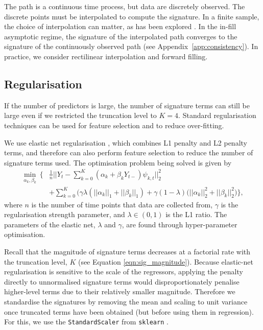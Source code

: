 \documentclass[a4paper, 12pt]{article}
\theoremstyle{remark}
\begin{document}
The path is a continuous time process, but data are discretely observed. The discrete points must be interpolated to compute the signature. In a finite sample, the choice of interpolation can matter, as has been explored \citep{morrill2022onthe}. In the in-fill asymptotic regime, the signature of the interpolated path converges to the signature of the continuously observed path (see Appendix~\ref{app:consistency}). In practice, we consider rectilinear interpolation and forward filling.

\subsection{Regularisation}\label{sec:regularisation}

If the number of predictors is large, the number of signature terms can still be large even if we restricted the truncation level to $K=4$. Standard regularisation techniques can be used for feature selection and to reduce over-fitting.

We use elastic net regularisation \citep{zou2005regularization}, which combines L1 penalty and L2 penalty terms, and therefore can also perform feature selection to reduce the number of signature terms used. The optimisation problem being solved is given by
\begin{align*}
    \min_{\alpha_k, \beta_k} \: \bigg\{ & \frac{1}{n}\bigg|\bigg|Y_t - \sum_{k=0}^K (\alpha_k+\beta_kY_{t-}) \psi_{k,t}\bigg|\bigg|_2^2 \\
    & +  \sum_{k=0}^K \bigg(\gamma \lambda (||\alpha_k||_1 + ||\beta_k||_1)
+ \gamma (1 - \lambda) (||\alpha_k||_2^2 + ||\beta_k||^2_2 \bigg) \bigg\},
\end{align*}
where \(n\) is the number of time points that data are collected from,  \(\gamma\) is the regularisation strength parameter, and \(\lambda\in (0,1)\) is the L1 ratio. 
The parameters of the elastic net, \(\lambda\) and \(\gamma\), are found through hyper-parameter optimisation.

Recall that the magnitude of signature terms decreases at a factorial rate with the truncation level, $K$ (see Equation \ref{eqn:sig_magnitude}). Because elastic-net regularisation is sensitive to the scale of the regressors, applying the penalty directly to unnormalised signature terms would disproportionately penalise higher-level terms due to their relatively smaller magnitude. Therefore we standardise the signatures by removing the mean and scaling to unit variance once truncated terms have been obtained (but before using them in regression). For this, we use the \texttt{StandardScaler} from \texttt{sklearn} \citep{pedregosa2011scikit}.
\end{document}
